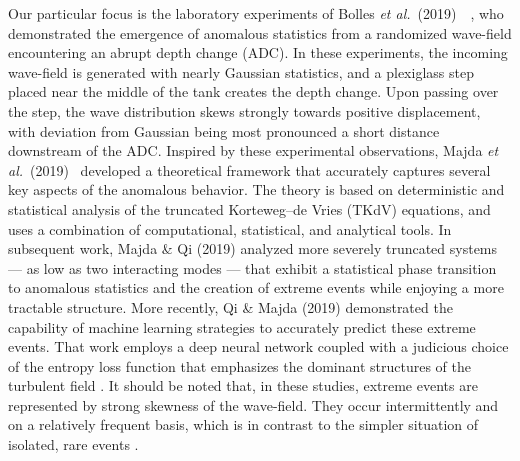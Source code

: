 \documentclass[11pt]{article}
\newcommand{\boetal}{Bolles {\it et al.}~(2019)~}
\newcommand{\maetal}{Majda {\it et al.}~(2019)~}
\begin{document}
Our particular focus is the laboratory experiments of \boetal~\cite{bolles2019}, who demonstrated the emergence of anomalous statistics from a randomized wave-field encountering an abrupt depth change (ADC). In these experiments, the incoming wave-field is generated with nearly Gaussian statistics, and a plexiglass step placed near the middle of the tank creates the depth change. Upon passing over the step, the wave distribution skews strongly towards positive displacement, with deviation from Gaussian being most pronounced a short distance downstream of the ADC. Inspired by these experimental observations, \maetal \cite{majda2019} developed a theoretical framework that accurately captures several key aspects of the anomalous behavior. The theory is based on deterministic and statistical analysis of the truncated Korteweg–de Vries (TKdV) equations, and uses a combination of computational, statistical, and analytical tools. In subsequent work, Majda \& Qi (2019) \cite{majdaqi2019} analyzed more severely truncated systems --- as low as two interacting modes --- that exhibit a statistical phase transition to anomalous statistics and the creation of extreme events while enjoying a more tractable structure. More recently, Qi \& Majda (2019) \cite{MachineLearning2019} demonstrated the capability of machine learning strategies to accurately predict these extreme events. That work employs a deep neural network coupled with a judicious choice of the entropy loss function that emphasizes the dominant structures of the turbulent field \cite{MachineLearning2019}. It should be noted that, in these studies, extreme events are represented by strong skewness of the wave-field. They occur intermittently and on a relatively frequent basis, which is in contrast to the simpler situation of isolated, rare events \cite{guth2019machine}.
\end{document}
